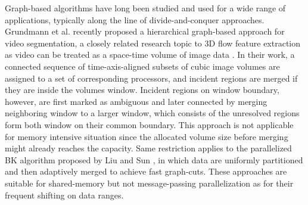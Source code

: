 Graph-based algorithms have long been studied and used for a wide range of applications, typically along the line of divide-and-conquer approaches.
Grundmann et al. \cite{Grundmann2010} recently proposed a hierarchical graph-based approach for video segmentation, a closely related research topic to 3D flow feature extraction as video can be treated as a space-time volume of image data \cite{Klein2002}. In their work, a connected sequence of time-axis-aligned subsets of cubic image volumes are assigned to a set of corresponding processors, and incident regions are merged if they are inside the volumes window. Incident regions on window boundary, however, are first marked as ambiguous and later connected by merging neighboring window to a larger window, which consists of the unresolved regions form both window on their common boundary. This approach is not applicable for memory intensive situation since the allocated volume size before merging might already reaches the capacity. Same restriction applies to the parallelized BK algorithm \cite{Boykov2004} proposed by Liu and Sun \cite{Liu2010}, in which data are uniformly partitioned and then adaptively merged to achieve fast graph-cuts. These approaches are suitable for shared-memory but not message-passing parallelization as for their frequent shifting on data ranges.
